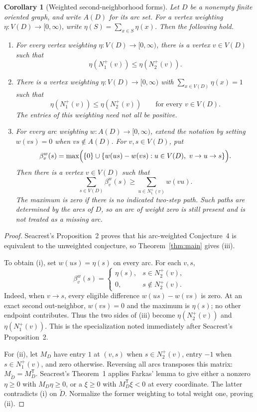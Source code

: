 \documentclass[11pt]{article}
\newtheorem{corollary}[theorem]{Corollary}
\theoremstyle{remark}
\begin{document}
\begin{corollary}[Weighted second-neighborhood forms]\label{cor:weighted-forms}
Let \(D\) be a nonempty finite oriented graph, and write \(A(D)\) for its
arc set.  For a vertex weighting \(\eta:V(D)\to[0,\infty)\), write
\(\eta(S)=\sum_{x\in S}\eta(x)\).  Then the following hold.
\begin{enumerate}[label=\textup{(\roman*)}]
\item For every vertex weighting \(\eta:V(D)\to[0,\infty)\), there is a
vertex \(v\in V(D)\) such that
\[
 \eta(N_1^+(v))\leq\eta(N_2^+(v)).
\]

\item There is a vertex weighting \(\eta:V(D)\to[0,\infty)\) with
\(\sum_{x\in V(D)}\eta(x)=1\) such that
\[
 \eta(N_1^+(v))\leq\eta(N_2^+(v))\qquad\text{for every }v\in V(D).
\]
The entries of this weighting need not all be positive.

\item For every arc weighting \(w:A(D)\to[0,\infty)\), extend the notation
by setting \(w(vs)=0\) when \(vs\notin A(D)\).  For \(v,s\in V(D)\), put
\[
 \beta_v^w(s)=\max\Bigl(\{0\}\cup
 \{w(us)-w(vs):u\in V(D),\ v\to u\to s\}\Bigr).
\]
Then there is a vertex \(v\in V(D)\) such that
\[
 \sum_{s\in V(D)}\beta_v^w(s)
 \geq \sum_{u\in N_1^+(v)}w(vu).
\]
The maximum is zero if there is no indicated two-step path.  Such paths
are determined by the arcs of \(D\), so an arc of weight zero is still
present and is not treated as a missing arc.
\end{enumerate}
\end{corollary}

\begin{proof}
Seacrest's Proposition~2 proves that his arc-weighted Conjecture~4 is
equivalent to the unweighted conjecture, so Theorem~\ref{thm:main} gives
\textup{(iii)}.

To obtain \textup{(i)}, set $w(us)=\eta(s)$ on every arc.  For each $v,s$,
\[
 \beta_v^w(s)=
 \begin{cases}
  \eta(s),&s\in N_2^+(v),\\
  0,&s\notin N_2^+(v).
 \end{cases}
\]
Indeed, when $v\to s$, every eligible difference $w(us)-w(vs)$ is zero.
At an exact second out-neighbor, $w(vs)=0$ and the maximum is $\eta(s)$;
no other endpoint contributes.  Thus the two sides of \textup{(iii)}
become $\eta(N_2^+(v))$ and $\eta(N_1^+(v))$.  This is the
specialization noted immediately after Seacrest's Proposition~2.

For \textup{(ii)}, let $M_D$ have entry $1$ at $(v,s)$ when
$s\in N_2^+(v)$, entry $-1$ when $s\in N_1^+(v)$, and zero otherwise.
Reversing all arcs transposes this matrix:
$M_{\overleftarrow D}=M_D^{\mathsf T}$.  Seacrest's Theorem~1 applies
Farkas' lemma to give either a nonzero $\eta\ge0$ with $M_D\eta\ge0$,
or a $\xi\ge0$ with $M_D^{\mathsf T}\xi<0$ at every coordinate.
The latter contradicts \textup{(i)} on $\overleftarrow D$.
Normalize the former weighting to total weight one, proving \textup{(ii)}.
\end{proof}
\end{document}
